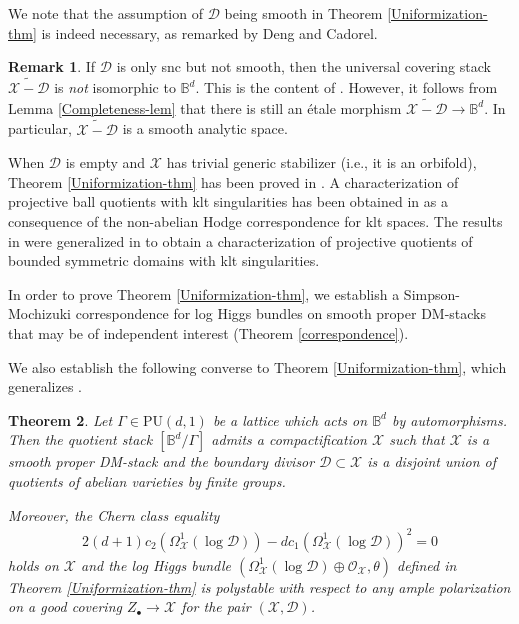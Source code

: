 \documentclass[a4paper]{amsart}
\newtheorem{theorem}{Theorem}[section]
\theoremstyle{definition}
\newtheorem{remark}[theorem]{Remark}
\begin{document}
We note that the assumption of $\mathscr{D}$ being smooth in Theorem \ref{Uniformization-thm} is indeed necessary, as remarked by Deng and Cadorel. 

\begin{remark}
If $\mathscr{D}$ is only snc but not smooth, then the universal covering stack $\widetilde{\mathscr{X}-\mathscr{D}}$ is \emph{not} isomorphic to $\mathbb{B}^d$. This is the content of \cite[Theorem 5.7(ii)]{dengcadorel}. However, it follows from Lemma \ref{Completeness-lem} that there is still an \'etale morphism $\widetilde{\mathscr{X}-\mathscr{D}}\to\mathbb{B}^d$. In particular, $\widetilde{\mathscr{X}-\mathscr{D}}$ is a smooth analytic space.
\end{remark}

When $\mathscr{D}$ is empty and $\mathscr{X}$ has trivial generic stabilizer (i.e., it is an orbifold), Theorem \ref{Uniformization-thm} has been proved in \cite{GP24}. A characterization of projective ball quotients with klt singularities has been obtained in \cite{GKPT} as a consequence of the non-abelian Hodge correspondence for klt spaces. The results in \cite{GKPT} were generalized in \cite{P23} to obtain a characterization of projective quotients of bounded symmetric domains with klt singularities. 

In order to prove Theorem \ref{Uniformization-thm}, we establish a Simpson-Mochizuki correspondence for log Higgs bundles on smooth proper DM-stacks that may be of independent interest (Theorem \ref{correspondence}). 

We also establish the following converse to Theorem \ref{Uniformization-thm}, which generalizes \cite[Theorem B]{dengcadorel}.

\begin{theorem}\label{Converse-thm}
Let $\Gamma\in\mathrm{PU}(d,1)$ be a lattice which acts on $\mathbb{B}^d$ by automorphisms. Then the quotient stack $[\mathbb{B}^d/\Gamma]$ admits a compactification $\mathscr{X}$ such that $\mathscr{X}$ is a smooth proper DM-stack and the boundary divisor $\mathscr{D}\subset\mathscr{X}$ is a disjoint union of quotients of abelian varieties by finite groups.  

Moreover, the Chern class equality
\begin{align}\label{CCeq}
2(d+1)c_2(\Omega^1_{\mathscr{X}}(\log \mathscr{D}))-dc_1(\Omega^1_{\mathscr{X}}(\log \mathscr{D}))^2=0
\end{align}
holds on $\mathscr{X}$ and the log Higgs bundle $(\Omega^1_{\mathscr{X}}(\log \mathscr{D})\oplus\mathcal{O}_{\mathscr{X}},\theta)$ defined in Theorem \ref{Uniformization-thm} is polystable with respect to any ample polarization on a good covering $Z_\bullet\to\mathscr{X}$ for the pair $(\mathscr{X},\mathscr{D})$.
\end{theorem}
\end{document}
